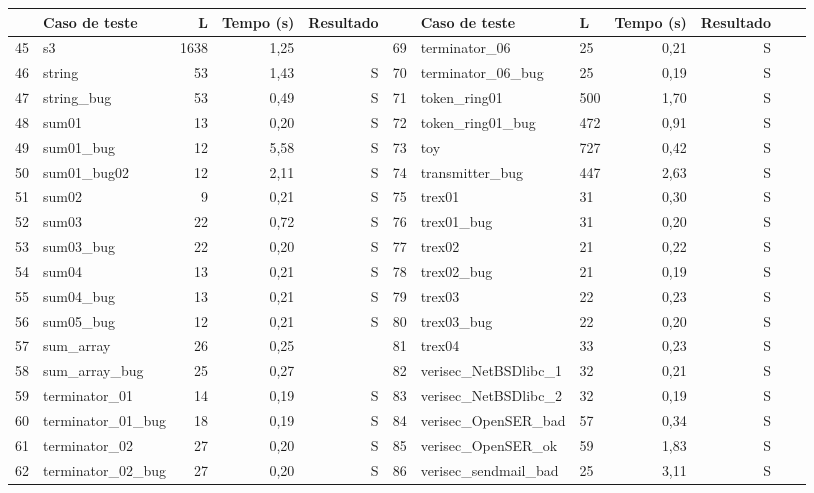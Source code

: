 \begin{table*}[t!]
\renewcommand\arraystretch{1.18}
\setlength{\tabcolsep}{1.5pt}
\begin{center} {\small
\begin{tabular}{|c|l|r|r|r||r|l|l|r|r|r|l|}
\hline
	&\textbf{Caso de teste}		&\textbf{L}	&\textbf{Tempo (s)}	&\textbf{Resultado}	&	&\textbf{Caso de teste}		&\textbf{L}	&\textbf{Tempo (s)}	&\textbf{Resultado}	\\
\hline
45	&s3			&1638	&1,25		&\Cross		&69	&terminator\_06		&25	&0,21		&S		\\
\hline
46	&string			&53	&1,43		&S		&70	&terminator\_06\_bug	&25	&0,19		&S		\\
\hline
47	&string\_bug		&53	&0,49		&S		&71	&token\_ring01		&500	&1,70		&S		\\
\hline
48	&sum01			&13	&0,20		&S		&72	&token\_ring01\_bug	&472	&0,91		&S		\\
\hline
49	&sum01\_bug		&12	&5,58		&S		&73	&toy			&727	&0,42		&S		\\
\hline
50	&sum01\_bug02		&12	&2,11		&S		&74	&transmitter\_bug	&447	&2,63		&S		\\
\hline
51	&sum02			&9	&0,21		&S		&75	&trex01			&31	&0,30		&S		\\
\hline
52	&sum03			&22	&0,72		&S		&76	&trex01\_bug		&31	&0,20		&S		\\
\hline
53	&sum03\_bug		&22	&0,20		&S		&77	&trex02			&21	&0,22		&S		\\
\hline
54	&sum04			&13	&0,21		&S		&78	&trex02\_bug		&21	&0,19		&S		\\
\hline
55	&sum04\_bug		&13	&0,21		&S		&79	&trex03			&22	&0,23		&S		\\
\hline
56	&sum05\_bug		&12	&0,21		&S		&80	&trex03\_bug		&22	&0,20		&S		\\
\hline
57	&sum\_array		&26	&0,25		&\Cross		&81	&trex04			&33	&0,23		&S		\\
\hline
58	&sum\_array\_bug	&25	&0,27		&\Cross		&82	&verisec\_NetBSDlibc\_1	&32	&0,21		&S		\\
\hline
59	&terminator\_01		&14	&0,19		&S		&83	&verisec\_NetBSDlibc\_2	&32	&0,19		&S		\\
\hline
60	&terminator\_01\_bug	&18	&0,19		&S		&84	&verisec\_OpenSER\_bad	&57	&0,34		&S		\\
\hline
61	&terminator\_02		&27	&0,20		&S		&85	&verisec\_OpenSER\_ok	&59	&1,83		&S		\\
\hline
62	&terminator\_02\_bug	&27	&0,20		&S		&86	&verisec\_sendmail\_bad	&25	&3,11		&S		\\
\hline

\end{tabular}}
\end{center}
\end{table*}
